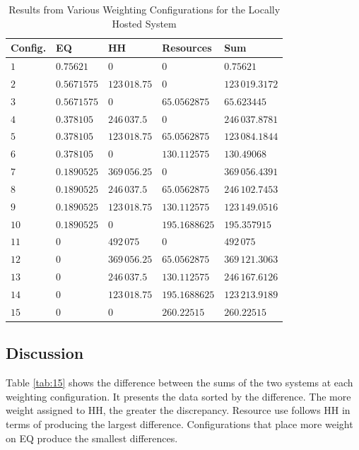 \documentclass[final,journal,10pt,letterpaper,oneside,twocolumn,compsoc]%
{IEEEtran}
\begin{document}
\begin{table}[htbp]
  \caption{Results from Various Weighting Configurations for the Locally Hosted
           System}
  \label{tab:14}
  \centering
    \begin{tabular}{| l | l | l | l | l |}
      \hline
      Config. & EQ & HH & Resources & Sum \\
      \hline
      $1$  & $0.75621$   & $0$          & $0$           & $0.75621$ \\
      $2$  & $0.5671575$ & $123\,018.75$  & $0$           & $123\,019.3172$ \\
      $3$  & $0.5671575$ & $0$          & $65.0562875$  & $65.623445$ \\
      $4$  & $0.378105$  & $246\,037.5$   & $0$           & $246\,037.8781$ \\
      $5$  & $0.378105$  & $123\,018.75$  & $65.0562875$  & $123\,084.1844$ \\
      $6$  & $0.378105$  & $0$          & $130.112575$  & $130.49068$ \\
      $7$  & $0.1890525$ & $369\,056.25$  & $0$           & $369\,056.4391$ \\
      $8$  & $0.1890525$ & $246\,037.5$   & $65.0562875$  & $246\,102.7453$ \\
      $9$  & $0.1890525$ & $123\,018.75$  & $130.112575$  & $123\,149.0516$ \\
      $10$ & $0.1890525$ & $0$          & $195.1688625$ & $195.357915$ \\
      $11$ & $0$         & $492\,075$     & $0$           & $492\,075$ \\
      $12$ & $0$         & $369\,056.25$  & $65.0562875$  & $369\,121.3063$ \\
      $13$ & $0$         & $246\,037.5$   & $130.112575$  & $246\,167.6126$ \\
      $14$ & $0$         & $123\,018.75$  & $195.1688625$ & $123\,213.9189$ \\
      $15$ & $0$         & $0$          & $260.22515$   & $260.22515$ \\
      \hline
    \end{tabular}
\end{table}

\subsection{Discussion}
Table \ref{tab:15} shows the difference between the sums of the two systems at
each
weighting configuration. It presents the data sorted by the difference. The more
weight assigned to HH, the greater the discrepancy. Resource use
follows HH in terms of producing the largest difference.
Configurations that place more weight on EQ produce the smallest
differences.
\end{document}

